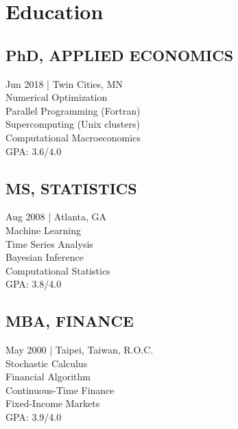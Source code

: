 \documentclass[]{hieudo-build}
\begin{document}
%
%
\begin{minipage}[t]{0.34\textwidth} 

\section{Education} 

\subsection{PhD, APPLIED ECONOMICS}
{\color{gray} Jun 2018 | Twin Cities, MN } \\
Numerical Optimization \\
Parallel Programming (Fortran) \\
Supercomputing (Unix clusters)\\
Computational Macroeconomics \\
GPA: 3.6/4.0 \\
\sectionsep

\subsection{MS, STATISTICS}
{\color{light-gray} Aug 2008 | Atlanta, GA}  \\
Machine Learning \\ 
Time Series Analysis \\ 
Bayesian Inference \\
Computational Statistics \\
GPA: 3.8/4.0 \\
\sectionsep

\subsection{MBA, FINANCE}
{\color{gray} May 2000 | Taipei, Taiwan, R.O.C.} \\
Stochastic Calculus \\
Financial Algorithm \\
Continuous-Time Finance \\
Fixed-Income Markets \\
GPA: 3.9/4.0 \\
\sectionsep


\end{minipage}
\end{document}
